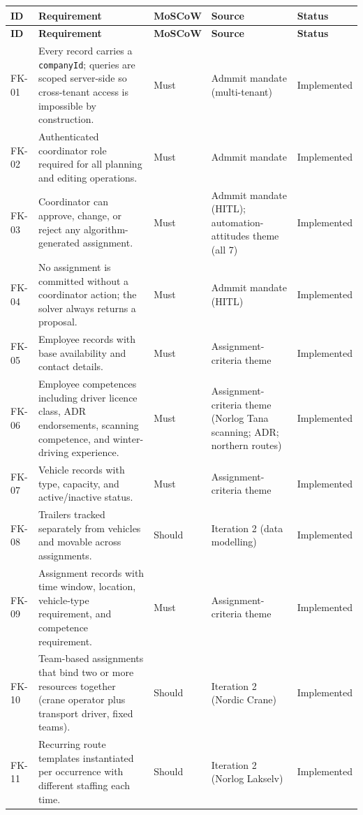 \begin{footnotesize}
\begin{longtable}{@{}p{}p{}p{}p{}p{}@{}}
\toprule
\textbf{ID} & \textbf{Requirement} & \textbf{MoSCoW} & \textbf{Source} & \textbf{Status} \\
\midrule
\endfirsthead
\toprule
\textbf{ID} & \textbf{Requirement} & \textbf{MoSCoW} & \textbf{Source} & \textbf{Status} \\
\midrule
\endhead
\bottomrule
\endfoot
FK-01 & Every record carries a \texttt{companyId}; queries are scoped server-side so cross-tenant access is impossible by construction. & Must & Admmit mandate (multi-tenant) & Implemented \\
FK-02 & Authenticated coordinator role required for all planning and editing operations. & Must & Admmit mandate & Implemented \\
FK-03 & Coordinator can approve, change, or reject any algorithm-generated assignment. & Must & Admmit mandate (HITL); automation-attitudes theme (all 7) & Implemented \\
FK-04 & No assignment is committed without a coordinator action; the solver always returns a proposal. & Must & Admmit mandate (HITL) & Implemented \\
FK-05 & Employee records with base availability and contact details. & Must & Assignment-criteria theme & Implemented \\
FK-06 & Employee competences including driver licence class, ADR endorsements, scanning competence, and winter-driving experience. & Must & Assignment-criteria theme (Norlog Tana scanning; ADR; northern routes) & Implemented \\
FK-07 & Vehicle records with type, capacity, and active/inactive status. & Must & Assignment-criteria theme & Implemented \\
FK-08 & Trailers tracked separately from vehicles and movable across assignments. & Should & Iteration 2 (data modelling) & Implemented \\
FK-09 & Assignment records with time window, location, vehicle-type requirement, and competence requirement. & Must & Assignment-criteria theme & Implemented \\
FK-10 & Team-based assignments that bind two or more resources together (crane operator plus transport driver, fixed teams). & Should & Iteration 2 (Nordic Crane) & Implemented \\
FK-11 & Recurring route templates instantiated per occurrence with different staffing each time. & Should & Iteration 2 (Norlog Lakselv) & Implemented \\

\end{longtable}
\end{footnotesize}
